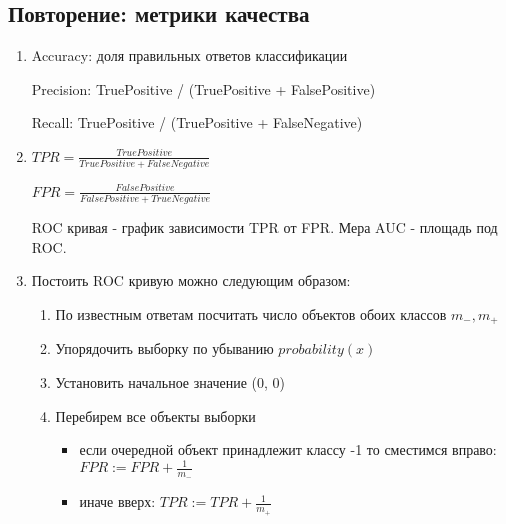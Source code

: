 \documentclass[12pt]{article}
\begin{document}
\subsection*{Повторение: метрики качества}
\begin{enumerate}
    \item
        Accuracy: доля правильных ответов классификации

        Precision: TruePositive / (TruePositive + FalsePositive)

        Recall: TruePositive / (TruePositive + FalseNegative)

    \item
        $TPR = \frac{TruePositive}{TruePositive + FalseNegative}$

        $FPR = \frac{FalsePositive}{FalsePositive + TrueNegative}$

        ROC кривая - график зависимости TPR от FPR.
        Мера AUC - площадь под ROC.

    \item
        Постоить ROC кривую можно следующим образом:
        \begin{enumerate}
            \item
                По известным ответам посчитать число объектов
                обоих классов $m_-, m_+$
            \item
                Упорядочить выборку по убыванию $probability(x)$
            \item
                Установить начальное значение (0, 0)
            \item
                Перебирем все объекты выборки
                \begin{itemize}
                    \item
                        если очередной объект принадлежит классу -1
                        то сместимся вправо: $FPR := FPR + \frac{1}{m_-}$
                    \item
                        иначе вверх: $TPR := TPR + \frac{1}{m_+}$
                \end{itemize}

        \end{enumerate}

\end{enumerate}
\end{document}
